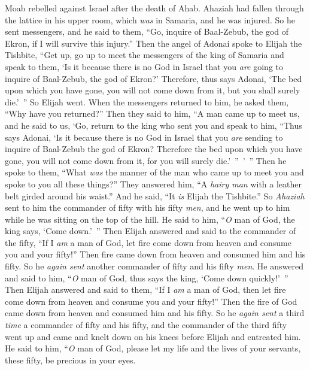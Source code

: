 
\begin{biblechapter} %
 Moab rebelled against Israel after the death of Ahab.
\verse Ahaziah had fallen through the lattice in his upper room, which \textit{was} in Samaria, and he was injured. So he sent messengers, and he said to them, “Go, inquire of Baal-Zebub, the god of Ekron, if I will survive this injury.”
\verse Then the angel of Adonai spoke to Elijah the Tishbite, “Get up, go up to meet the messengers of the king of Samaria and speak to them, ‘Is it because there is no God in Israel that you \textit{are} going to inquire of Baal-Zebub, the god of Ekron?’
\verse Therefore, thus says Adonai, ‘The bed upon which you have gone, you will not come down from it, but you shall surely die.’ ” So Elijah went.
\verse When the messengers returned to him, he asked them, “Why have you returned?”
\verse Then they said to him, “A man came up to meet us, and he said to us, ‘Go, return to the king who sent you and speak to him, “Thus says Adonai, ‘Is it because there is no God in Israel that you \textit{are} sending to inquire of Baal-Zebub the god of Ekron? Therefore the bed upon which you have gone, you will not come down from it, for you will surely die.’ ” ’ ”
\verse Then he spoke to them, “What \textit{was} the manner of the man who came up to meet you and spoke to you all these things?”
\verse They answered him, “A \textit{hairy man} with a leather belt girded around his waist.” And he said, “It \textit{is} Elijah the Tishbite.”
\verse So \textit{Ahaziah} sent to him the commander of fifty with his fifty \textit{men}, and he went up to him while he was sitting on the top of the hill. He said to him, “\textit{O} man of God, the king says, ‘Come down.’ ”
\verse Then Elijah answered and said to the commander of the fifty, “If I \textit{am} a man of God, let fire come down from heaven and consume you and your fifty!” Then fire came down from heaven and consumed him and his fifty.
\verse So he \textit{again sent} another commander of fifty and his fifty \textit{men}. He answered and said to him, “\textit{O} man of God, thus says the king, ‘Come down quickly!’ ”
\verse Then Elijah answered and said to them, “If I \textit{am} a man of God, then let fire come down from heaven and consume you and your fifty!” Then the fire of God came down from heaven and consumed him and his fifty.
\verse So he \textit{again sent} a third \textit{time} a commander of fifty and his fifty, and the commander of the third fifty went up and came and knelt down on his knees before Elijah and entreated him. He said to him, “\textit{O} man of God, please let my life and the lives of your servants, these fifty, be precious in your eyes.

\end{biblechapter}

